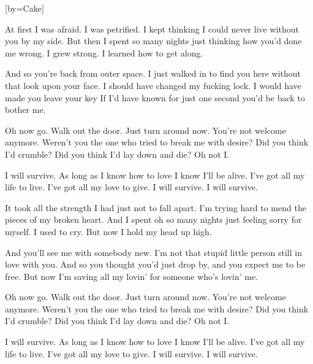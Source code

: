 [by={Cake}]

\beginverse
At first I was afraid. I was petrified.
I kept thinking I could never live without you by my side.
But then I spent so many nights just thinking how you'd done me wrong.
I grew strong. I learned how to get along.
\endverse

\beginverse
And so you're back from outer space.
I just walked in to find you here without that look upon your face.
I should have changed my fucking lock. I would have made you leave your key
If I'd have known for just one second you'd be back to bother me. 
\endverse

\beginverse
Oh now go. Walk out the door.
Just turn around now. You're not welcome anymore.
Weren't you the one who tried to break me with desire?
Did you think I'd crumble? Did you think I'd lay down and die?
Oh not I. 
\endverse

\beginchorus
I will survive.
As long as I know how to love I know I'll be alive.
I've got all my life to live. I've got all my love to give.
I will survive. I will survive. 
\endchorus

\beginverse
It took all the strength I had just not to fall apart.
I'm trying hard to mend the pieces of my broken heart.
And I spent oh so many nights just feeling sorry for myself.
I used to cry. But now I hold my head up high. 
\endverse

\beginverse
And you'll see me with somebody new.
I'm not that stupid little person still in love with you.
And so you thought you'd just drop by, and you expect me to be free.
But now I'm saving all my lovin' for someone who's lovin' me. 
\endverse

\beginverse
Oh now go. Walk out the door.
Just turn around now. You're not welcome anymore.
Weren't you the one who tried to break me with desire?
Did you think I'd crumble? Did you think I'd lay down and die?
Oh not I. 
\endverse

\beginchorus
I will survive.
As long as I know how to love I know I'll be alive.
I've got all my life to live. I've got all my love to give.
I will survive. I will survive. 
\endchorus

\endsong